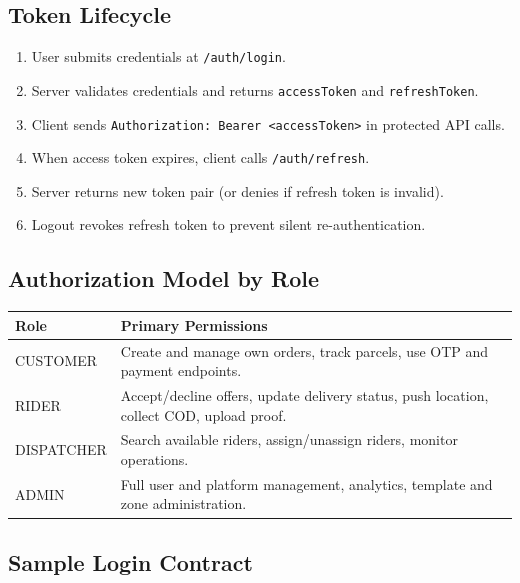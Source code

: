 \subsection{Token Lifecycle}

\begin{enumerate}
		\item User submits credentials at \texttt{/auth/login}.
		\item Server validates credentials and returns \texttt{accessToken} and
					\texttt{refreshToken}.
		\item Client sends \texttt{Authorization: Bearer <accessToken>} in protected API calls.
		\item When access token expires, client calls \texttt{/auth/refresh}.
		\item Server returns new token pair (or denies if refresh token is invalid).
		\item Logout revokes refresh token to prevent silent re-authentication.
\end{enumerate}

\subsection{Authorization Model by Role}

\begin{tcolorbox}[
		enhanced,
		colback=AccentGold!8,
		colframe=AccentGold,
		arc=4pt,
		boxrule=0.8pt,
		left=10pt, right=10pt, top=6pt, bottom=6pt
]
\begin{tabularx}{\textwidth}{@{}p{2.6cm}X@{}}
\toprule
\textbf{Role} & \textbf{Primary Permissions} \\
\midrule
CUSTOMER & Create and manage own orders, track parcels, use OTP and payment endpoints. \\
RIDER & Accept/decline offers, update delivery status, push location, collect COD, upload proof. \\
DISPATCHER & Search available riders, assign/unassign riders, monitor operations. \\
ADMIN & Full user and platform management, analytics, template and zone administration. \\
\bottomrule
\end{tabularx}
\end{tcolorbox}

\subsection{Sample Login Contract}

